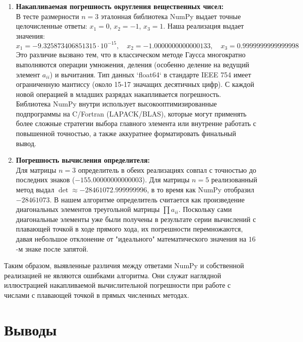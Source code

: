 \documentclass[a4paper,12pt]{article}
\begin{document}
\begin{enumerate}
    \item \textbf{Накапливаемая погрешность округления вещественных чисел:} \\
    В тесте размерности $n=3$ эталонная библиотека NumPy выдает точные целочисленные ответы: $x_1 = 0$, $x_2 = -1$, $x_3 = 1$. Наша реализация выдает значения: 
    $$x_1 = -9.325873406851315 \cdot 10^{-15}, \quad x_2 = -1.0000000000000133, \quad x_3 = 0.9999999999999998$$
    Это различие вызвано тем, что в классическом методе Гаусса многократно выполняются операции умножения, деления (особенно деление на ведущий элемент $a_{ii}$) и вычитания. Тип данных `float64` в стандарте IEEE 754 имеет ограниченную мантиссу (около 15-17 значащих десятичных цифр). С каждой новой операцией в младших разрядах накапливается погрешность. Библиотека NumPy внутри использует высокооптимизированные подпрограммы на C/Fortran (LAPACK/BLAS), которые могут применять более сложные стратегии выбора главного элемента или внутренне работать с повышенной точностью, а также аккуратнее форматировать финальный вывод.
    
    \item \textbf{Погрешность вычисления определителя:} \\
    Для матрицы $n=3$ определитель в обеих реализациях совпал с точностью до последних знаков ($-155.00000000000003$). Для матрицы $n=5$ реализованный метод выдал $\det \approx -28461072.999999996$, в то время как NumPy отобразил $-28461073$. В нашем алгоритме определитель считается как произведение диагональных элементов треугольной матрицы $\prod a_{ii}$. Поскольку сами диагональные элементы уже были получены в результате серии вычислений с плавающей точкой в ходе прямого хода, их погрешности перемножаются, давая небольшое отклонение от "идеального" математического значения на $16$-м знаке после запятой.
\end{enumerate}

Таким образом, выявленные различия между ответами NumPy и собственной реализацией не являются ошибками алгоритма. Они служат наглядной иллюстрацией накапливаемой вычислительной погрешности при работе с числами с плавающей точкой в прямых численных методах.

\newpage
\section{Выводы}
\end{document}
